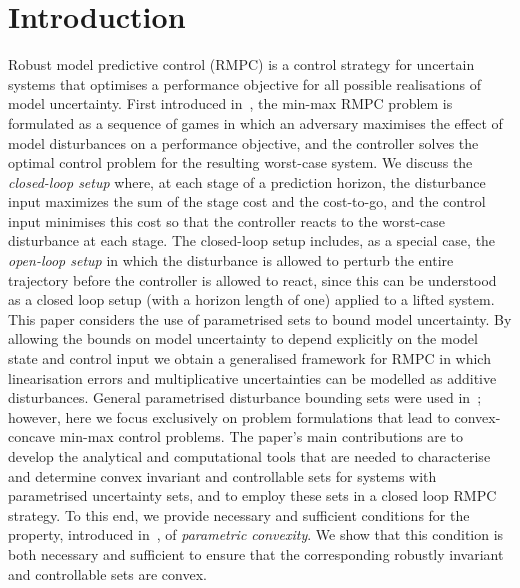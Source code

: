 \documentclass[journal]{IEEEtran}
\theoremstyle{remark}
\theoremstyle{definition}
\begin{document}
\def\genmat{\Xi} \def\genvec{\xi}

\section{Introduction}
% 
% 
% 
% 


Robust model predictive control (RMPC) is a control strategy for uncertain systems that optimises a 
performance objective for all possible realisations of model uncertainty.
%
First introduced in~\cite{Witsenhausen:1968}, the min-max RMPC problem is formulated as a sequence of games in which an adversary maximises the effect of model disturbances on a performance objective, and the controller solves the optimal
control problem for the resulting worst-case system.
%
We discuss the \emph{closed-loop setup} where, at each stage of a prediction horizon, the disturbance input maximizes the sum of the stage cost and the cost-to-go, and the control input minimises this cost so that the controller reacts to the worst-case disturbance at each stage.
%
The closed-loop setup includes, as a special case, the \emph{open-loop setup} in which the disturbance is allowed to perturb the 
entire trajectory before the controller is allowed to react, since this can be understood as a closed loop setup (with a horizon length of one) applied to a lifted system.
%
This paper considers the use of parametrised sets to bound model uncertainty. By allowing the bounds on model uncertainty to depend explicitly on the model state and control input we obtain a generalised framework for RMPC in which linearisation errors and multiplicative uncertainties can be modelled as additive disturbances.
%
General parametrised disturbance bounding sets were used in~\cite{Rakovic03,Rakovic06}; however, here we focus exclusively on problem formulations that lead to convex-concave min-max control problems.
% 
The paper's main contributions are to develop
the analytical and computational tools that are needed to characterise and determine convex invariant and controllable sets for systems with parametrised uncertainty sets, and to employ these sets in a closed loop RMPC strategy. To this end, we provide necessary and sufficient conditions for the property, introduced in~\cite{Schaich:CDC:2015}, of \emph{parametric convexity}. We show that this condition is both necessary and sufficient to ensure that the corresponding robustly invariant and controllable sets are convex.
\end{document}
